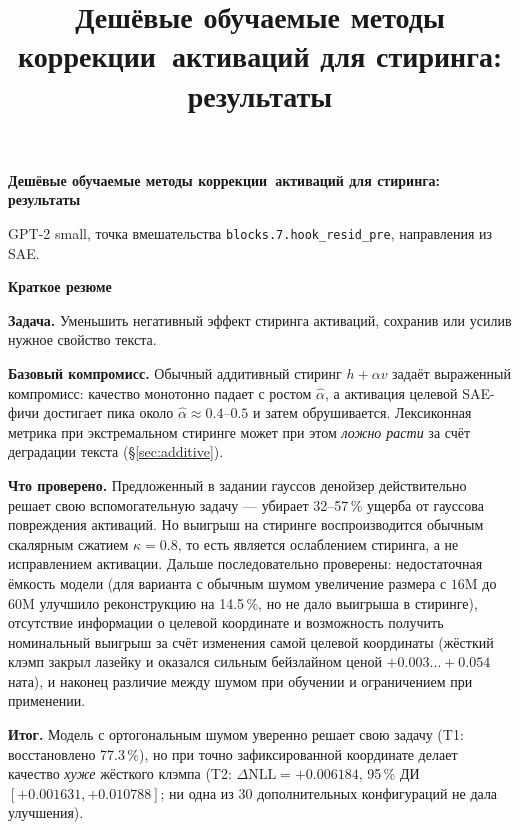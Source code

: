 \documentclass[10pt,a4paper]{article}
\title{\vspace{-1.4cm}\bfseries Дешёвые обучаемые методы коррекции\ активаций для стиринга:\\ результаты}
\author{}
\date{}
\newcommand{\ahat}{\hat{\alpha}}
\begin{document}
\begin{center}
{\LARGE\bfseries
Дешёвые обучаемые методы коррекции\ активаций для стиринга:\\ результаты
\par}

\vspace{0.9em}

{\small
GPT-2 small, точка вмешательства
\texttt{blocks.7.hook\_resid\_pre}, направления из SAE.
\par}

\vspace{0.75em}
\end{center}

\begin{tcolorbox}[colback=white,colframe=accent,boxrule=0.9pt,arc=1pt,
                  left=10pt,right=10pt,top=8pt,bottom=8pt]
\textbf{\large Краткое резюме}\medskip

\textbf{Задача.} Уменьшить негативный эффект стиринга активаций, сохранив или
усилив нужное свойство текста.

\textbf{Базовый компромисс.} Обычный аддитивный стиринг $h + \alpha v$ задаёт
выраженный компромисс: качество монотонно падает с ростом $\ahat$, а активация
целевой SAE-фичи достигает пика около $\ahat \approx 0.4$--$0.5$ и затем
обрушивается. Лексиконная метрика при экстремальном стиринге может при этом
\emph{ложно расти} за счёт деградации текста (\S\ref{sec:additive}).

\textbf{Что проверено.} Предложенный в задании гауссов денойзер действительно
решает свою вспомогательную задачу — убирает 32--57\,\% ущерба от гауссова
повреждения активаций. Но выигрыш на стиринге воспроизводится обычным скалярным
сжатием $\kappa = 0.8$, то есть является ослаблением стиринга, а не
исправлением активации. Дальше последовательно проверены: недостаточная ёмкость
модели (для варианта с обычным шумом увеличение размера с $16\text{M}$ до
$60\text{M}$ улучшило реконструкцию на 14.5\,\%, но не дало выигрыша в стиринге),
отсутствие информации о целевой координате и возможность получить номинальный
выигрыш за счёт изменения самой целевой координаты
(жёсткий клэмп закрыл лазейку и оказался сильным бейзлайном ценой
$+0.003\ldots+0.054$ ната), и наконец различие между шумом при обучении и ограничением при применении.

\textbf{Итог.} Модель с ортогональным шумом уверенно решает свою задачу
(T1: восстановлено 77.3\,\%), но при точно зафиксированной координате делает
качество \emph{хуже} жёсткого клэмпа (T2: $\Delta\mathrm{NLL} = +0.006184$,
95\,\% ДИ $[+0.001631, +0.010788]$; ни одна из 30 дополнительных конфигураций не дала улучшения).


\end{tcolorbox}
\end{document}
